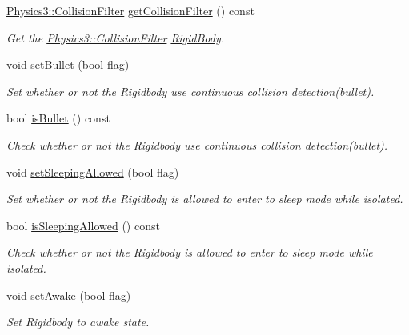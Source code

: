 \begin{DoxyCompactItemize}
\hyperlink{class_magnum_1_1_physics3_1_1_collision_filter}{Physics3\+::\+Collision\+Filter} \hyperlink{class_magnum_1_1_physics3_1_1_vehicle_af55e8960cf8043c0fa41d694d7fe096b}{get\+Collision\+Filter} () const 
\begin{DoxyCompactList}\small\item\em Get the \hyperlink{class_magnum_1_1_physics3_1_1_collision_filter}{Physics3\+::\+Collision\+Filter} \hyperlink{class_magnum_1_1_physics3_1_1_rigid_body}{Rigid\+Body}. \end{DoxyCompactList}\item 
void \hyperlink{class_magnum_1_1_physics3_1_1_vehicle_a021331348cdc03184a2728ffb219abaa}{set\+Bullet} (bool flag)
\begin{DoxyCompactList}\small\item\em Set whether or not the Rigidbody use continuous collision detection(bullet). \end{DoxyCompactList}\item 
bool \hyperlink{class_magnum_1_1_physics3_1_1_vehicle_a7d64edede40f64eb0d4934c0dbef804e}{is\+Bullet} () const 
\begin{DoxyCompactList}\small\item\em Check whether or not the Rigidbody use continuous collision detection(bullet). \end{DoxyCompactList}\item 
void \hyperlink{class_magnum_1_1_physics3_1_1_vehicle_a4f757b4007c5bc7487323ef786910cbe}{set\+Sleeping\+Allowed} (bool flag)
\begin{DoxyCompactList}\small\item\em Set whether or not the Rigidbody is allowed to enter to sleep mode while isolated. \end{DoxyCompactList}\item 
bool \hyperlink{class_magnum_1_1_physics3_1_1_vehicle_a245ca03865839880fcb812182c2ca513}{is\+Sleeping\+Allowed} () const 
\begin{DoxyCompactList}\small\item\em Check whether or not the Rigidbody is allowed to enter to sleep mode while isolated. \end{DoxyCompactList}\item 
void \hyperlink{class_magnum_1_1_physics3_1_1_vehicle_a58ebd7a0d773541ce33758e7aabb8446}{set\+Awake} (bool flag)
\begin{DoxyCompactList}\small\item\em Set Rigidbody to awake state. \end{DoxyCompactList}\item 

\end{DoxyCompactItemize}
